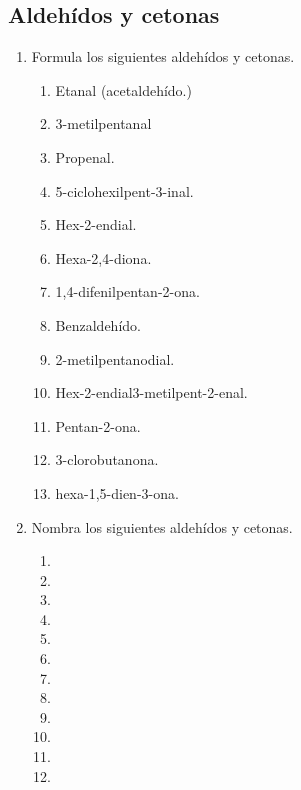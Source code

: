 \subsection*{Aldehídos y cetonas}
\begin{enumerate}
    \item Formula los siguientes aldehídos y cetonas.
          \begin{enumerate}
              \item Etanal (acetaldehído.)
              \item 3-metilpentanal
              \item Propenal.
              \item 5-ciclohexilpent-3-inal.
              \item Hex-2-endial.
              \item Hexa-2,4-diona.
              \item 1,4-difenilpentan-2-ona.
              \item Benzaldehído.
              \item 2-metilpentanodial.
              \item Hex-2-endial3-metilpent-2-enal.
              \item Pentan-2-ona.
              \item 3-clorobutanona.
              \item hexa-1,5-dien-3-ona.
          \end{enumerate}
    \item Nombra los siguientes aldehídos y cetonas.
          \begin{enumerate}
              \item {}
              \item {}
              \item {}
              \item {}
              \item {}
              \item {}
              \item {}
              \item {}
              \item {}
              \item {}
              \item {}
              \item {}
          \end{enumerate}
\end{enumerate}

